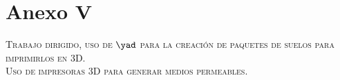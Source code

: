 \chapter*{Anexo V}

\begin{center}
\large\scshape Trabajo dirigido, uso de $\yad$ para la creaci\'on de paquetes de suelos para imprimirlos en 3D.\\
\vspace{2 cm}
Uso de impresoras 3D para generar medios permeables.
\end{center}

%



